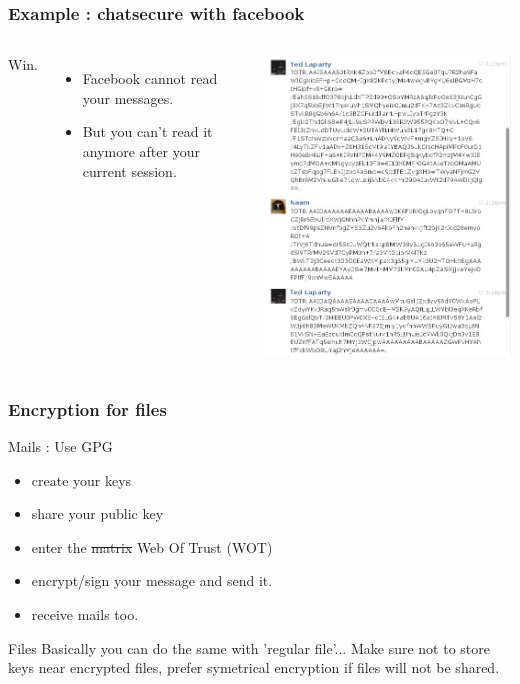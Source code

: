 \begin{frame}
    \frametitle{Example : chatsecure with facebook}
    \begin{columns}[c]
    Win.
    \begin{itemize}
    \item Facebook cannot read your messages.
    \item But you can't read it anymore after your current session.
    \end{itemize}
    \includegraphics[height=.9\textheight]{./materials/fb_otr}
    \end{columns}
\end{frame}
\begin{frame}
\frametitle{Encryption for files}
\begin{block}{Mails : Use GPG}
\begin{itemize}
\item create your keys
\item share your public key
\item enter the \sout{matrix} Web Of Trust (WOT)
\item encrypt/sign your message and send it.
\item receive mails too.
\end{itemize}
\end{block}
\begin{block}{Files}
Basically you can do the same with 'regular file'...
Make sure not to store keys near encrypted files, prefer symetrical encryption
if files will not be shared.
\end{block}
\end{frame}

